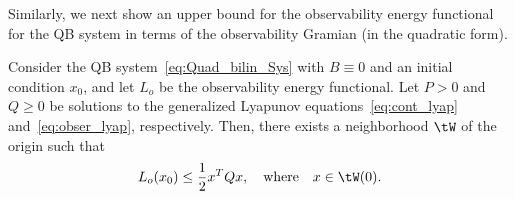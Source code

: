 Similarly,  we next show an upper bound for the observability energy functional for the QB system in terms of the observability Gramian (in the quadratic form).
\begin{theorem}\label{thm:obs:bound}
 Consider the QB system~\eqref{eq:Quad_bilin_Sys} with $B\equiv 0 $ and an initial condition $x_0$, and let  $L_o$ be the observability energy functional.  Let  $P>0$ and $Q\geq 0$ be  solutions to the generalized Lyapunov equations~\eqref{eq:cont_lyap} and~\eqref{eq:obser_lyap}, respectively. Then, there exists a neighborhood $\tW$ of the origin such that
 \begin{equation*}
  L_o(x_0) \leq  \dfrac{1}{2}x^TQx,\quad \mbox{where}\quad x\in\tW(0).
 \end{equation*}
\end{theorem}
